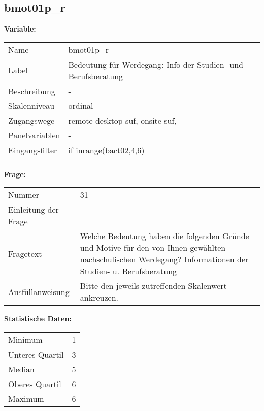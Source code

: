 	
	
	\subsection{bmot01p\_r}
	\label{subSection:bmot01p_r}

	\noindent\textbf{Variable:}\\
		\begin{tabular}{lL{11.3cm}}
			\label{tableVariable:bmot01p_r}
			Name & bmot01p\_r \\
			Label & Bedeutung für Werdegang: Info der Studien- und Berufsberatung \\
			Beschreibung & - \\
			Skalenniveau & ordinal \\
			Zugangswege &
				remote-desktop-suf,
				onsite-suf,
 \\
			Panelvariablen & -
			 \\
			Eingangsfilter & if inrange(bact02,4,6)  \\
 \\
		\end{tabular}

		\vspace*{1 cm}
		\noindent\textbf{Frage:}\\
		\begin{tabular}{lL{11.3cm}}
			\label{tableQuestion:bmot01p_r}
			Nummer & 31 \\
			Einleitung der Frage & - \\
			Fragetext & Welche Bedeutung haben die folgenden Gründe und Motive für den von Ihnen gewählten nachschulischen Werdegang?
Informationen der Studien- u. Berufsberatung \\
			Ausfüllanweisung & Bitte den jeweils zutreffenden Skalenwert ankreuzen. \\
		\end{tabular}


		\vspace*{1 cm}
		\noindent\textbf{Statistische Daten:}\\
			\begin{tabular}{ll}
				\label{tableStatistics:bmot01p_r}
					Minimum & 1 \\
					Unteres Quartil & 3 \\
					Median & 5 \\
					Oberes Quartil & 6 \\
					Maximum & 6 \\
			\end{tabular}



